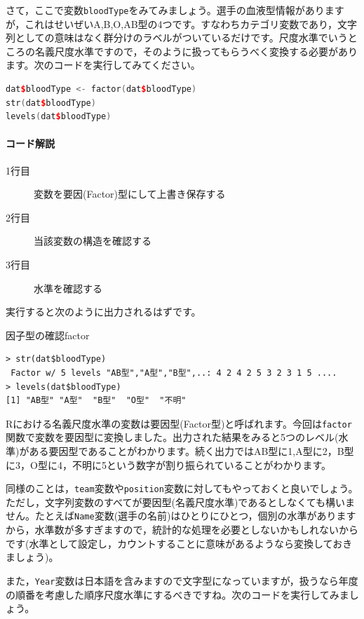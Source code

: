 \documentclass{ltjsbook}
\begin{document}
さて，ここで変数\verb|bloodType|をみてみましょう。選手の血液型情報がありますが，これはせいぜいA,B,O,AB型の4つです。すなわちカテゴリ変数であり，文字列としての意味はなく群分けのラベルがついているだけです。尺度水準でいうところの名義尺度水準ですので，そのように扱ってもらうべく変換する必要があります。次のコードを実行してみてください。


\begin{lstlisting}[language=c++,label={code:4_02},caption={Factor型に変換する}]
dat$bloodType <- factor(dat$bloodType)
str(dat$bloodType)
levels(dat$bloodType)
\end{lstlisting}
    
\paragraph{コード解説}
\begin{description}
    \item[1行目] 変数を要因(Factor)型にして上書き保存する
    \item[2行目] 当該変数の構造を確認する
    \item[3行目] 水準を確認する 
\end{description}

実行すると次のように出力されるはずです。
\begin{Rscreen}{因子型の確認}{factor}
\begin{verbatim}
> str(dat$bloodType)
 Factor w/ 5 levels "AB型","A型","B型",..: 4 2 4 2 5 3 2 3 1 5 ....
> levels(dat$bloodType)
[1] "AB型" "A型"  "B型"  "O型"  "不明"
\end{verbatim}
\end{Rscreen}
Rにおける名義尺度水準の変数は要因型(Factor型)と呼ばれます。今回は\verb|factor|関数で変数を要因型に変換しました。出力された結果をみると5つのレベル(水準)がある要因型であることがわかります。続く出力ではAB型に1,A型に2，B型に3，O型に4，不明に5という数字が割り振られていることがわかります。

同様のことは，\verb|team|変数や\verb|position|変数に対してもやっておくと良いでしょう。ただし，文字列変数のすべてが要因型(名義尺度水準)であるとしなくても構いません。たとえば\verb|Name|変数(選手の名前)はひとりにひとつ，個別の水準がありますから，水準数が多すぎますので，統計的な処理を必要としないかもしれないからです(水準として設定し，カウントすることに意味があるようなら変換しておきましょう)。

また，\verb|Year|変数は日本語を含みますので文字型になっていますが，扱うなら年度の順番を考慮した順序尺度水準にするべきですね。次のコードを実行してみましょう。
\end{document}
